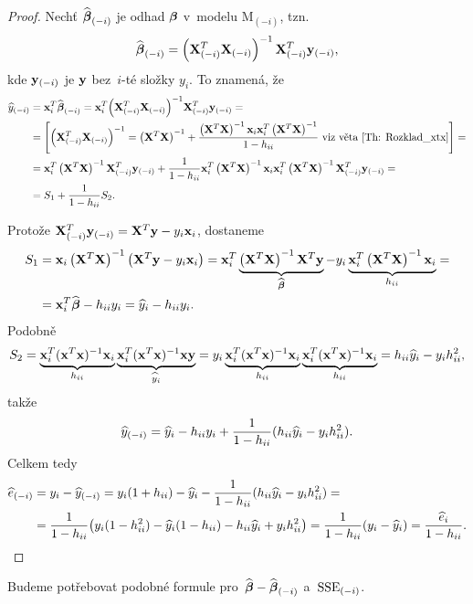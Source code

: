 \begin{proof}
	
	Nechť $\wbetab_{(-i)}$ je odhad $\betab$ v~modelu M$_{(-i)}$, tzn.
	 $$
	\wbetab_{(-i)} = \left(\X_{(-i)}^T \X_{(-i)} \right)^{-1} \X_{(-i)}^T \y_{(-i)},
	 $$
	kde $\y_{(-i)}$ je $\y$ bez~$i$-té složky $y_i$. To znamená, že
	\begin{align*}
	\hy_{(-i)} & = \x_i^T \wbetab_{(-i)} = \x_i^T \inv{\left(\X_{(-i)}^T \X_{(-i)} \right)} \X_{(-i)}^T \y_{(-i)} = \\
	 & = \left[\left(\X_{(-i)}^T \X_{(-i)} \right)^{-1} = \xtx + \frac{\xtx \x_i \x_i^T \xtx}{1 - \hii} \text{ viz věta \ref{Th: Rozklad_xtx}} \right] = \\
	 & = \x_i^T \xtx \X_{(-i)}^T \y_{(-i)} + \frac{1}{1 - \hii} \x_i^T \xtx \x_i \x_i^T \xtx \X_{(-i)}^T \y_{(-i)} = \\
	 & = S_1 + \frac{1}{1-\hii} S_2.
	\end{align*}
	
	Protože $\X_{(-i)}^T \y_{(-i)} = \X^T \y - y_i \x_i$, dostaneme
	\begin{align*}
	S_1 & = \x_i \xtx \left(\X^T \y - y_i \x_i \right) = \x_i^T \underbrace{\xtx \X^T \y}_{\wbetab} - y_i \underbrace{\x_i^T \xtx \x_i}_{\hii} = \\
	& = \x_i^T \wbetab - \hii y_i = \hy_i - \hii y_i.
	\end{align*}
	Podobně	
	 $$ S_2 = \underbrace{\x_i^T(\x^T\x)^{-1}\x_i}_{h_{ii}}\underbrace{\x_i^T(\x^T\x)^{-1}\x\y}_{\hyi} = y_i\underbrace{\x_i^T(\x^T\x)^{-1}\x_i}_{h_{ii}}\underbrace{\x_i^T(\x^T\x)^{-1}\x_i}_{h_{ii}} = h_{ii}\hyi-y_ih_{ii}^2, $$
	takže
	 $$ \hy_{(-i)} = \hyi-h_{ii}y_i+\frac{1}{1-h_{ii}}(h_{ii}\hyi-y_ih_{ii}^2). $$
	Celkem tedy
	\begin{align*}
	\he_{(-i)} & = y_i-\hy_{(-i)} = y_i(1+h_{ii})-\hyi-\frac{1}{1-h_{ii}}(h_{ii}\hyi-y_ih_{ii}^2) = \\
	& = \frac{1}{1-h_{ii}}\big(y_i(1-h_{ii}^2)-\hyi(1-h_{ii})-h_{ii}\hyi+y_ih_{ii}^2\big) = \frac{1}{1-h_{ii}}(y_i-\hyi) = \frac{\hei}{1-h_{ii}}.
	\end{align*}
\end{proof}

\renewcommand{\mini}[1]{#1_{(-i)}}
Budeme potřebovat podobné formule pro~$\wbetab-\wbetab_{(-i)}$ a~$\mini{\SSE}$.

